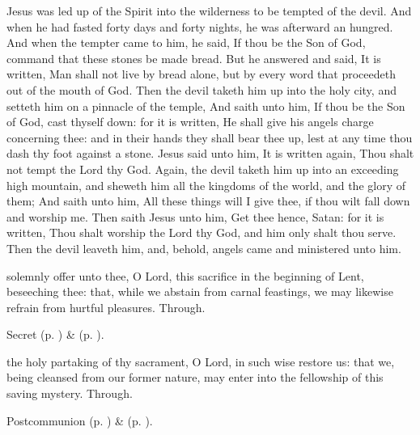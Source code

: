  Jesus was led up of the Spirit into the wilderness to be tempted of the devil. And when he had fasted forty days and forty nights, he was afterward an hungred. And when the tempter came to him, he said, If thou be the Son of God, command that these stones be made bread. But he answered and said, It is written, Man shall not live by bread alone, but by every word that proceedeth out of the mouth of God. Then the devil taketh him up into the holy city, and setteth him on a pinnacle of the temple, And saith unto him, If thou be the Son of God, cast thyself down: for it is written, He shall give his angels charge concerning thee: and in their hands they shall bear thee up, lest at any time thou dash thy foot against a stone. Jesus said unto him, It is written again, Thou shalt not tempt the Lord thy God. Again, the devil taketh him up into an exceeding high mountain, and sheweth him all the kingdoms of the world, and the glory of them; And saith unto him, All these things will I give thee, if thou wilt fall down and worship me. Then saith Jesus unto him, Get thee hence, Satan: for it is written, Thou shalt worship the Lord thy God, and him only shalt thou serve. Then the devil leaveth him, and, behold, angels came and ministered unto him.


\secret
{} solemnly offer unto thee, O Lord, this sacrifice in the beginning of Lent, beseeching thee: that, while we abstain from carnal feastings, we may likewise refrain from hurtful pleasures. Through.

\begin{rubric}
     Secret  (p. \pageref{AshWednesdayMassSecret}) \&   (p. \pageref{SPLivingDeparted}).
\end{rubric}


\postcommunion
{} the holy partaking of thy sacrament, O Lord, in such wise restore us: that we, being cleansed from our former nature, may enter into the fellowship of this saving mystery. Through.

\begin{rubric}
     Postcommunion  (p. \pageref{AshWednesdayMassPostcommunion}) \&   (p. \pageref{SPLivingDeparted}).
\end{rubric}


